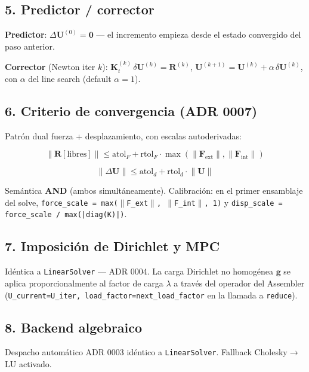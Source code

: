 \documentclass[11pt,letterpaper,oneside]{report}
\begin{document}
\subsection{5. Predictor / corrector}

\textbf{Predictor}: $\Delta\mathbf U^{(0)} = \mathbf 0$ --- el incremento empieza desde el estado convergido del paso anterior.

\textbf{Corrector} (Newton iter $k$): $\mathbf K_t^{(k)}\,\delta\mathbf U^{(k)} = \mathbf R^{(k)}$, $\mathbf U^{(k+1)} = \mathbf U^{(k)} + \alpha\,\delta\mathbf U^{(k)}$, con $\alpha$ del line search (default $\alpha = 1$).

\subsection{6. Criterio de convergencia (ADR 0007)}

Patrón dual fuerza + desplazamiento, con escalas autoderivadas:

\[
\lVert\mathbf R[\text{libres}]\rVert \le \text{atol}_F + \text{rtol}_F \cdot \max(\lVert\mathbf F_{\text{ext}}\rVert, \lVert\mathbf F_{\text{int}}\rVert)
\]

\[
\lVert\Delta\mathbf U\rVert \le \text{atol}_d + \text{rtol}_d \cdot \lVert\mathbf U\rVert
\]

Semántica \textbf{AND} (ambos simultáneamente). Calibración: en el primer ensamblaje del solve, \texttt{force\_scale = max(\ensuremath{\|}F\_ext\ensuremath{\|}, \ensuremath{\|}F\_int\ensuremath{\|}, 1)} y \texttt{disp\_scale = force\_scale / max(|diag(K)|)}.

\subsection{7. Imposición de Dirichlet y MPC}

Idéntica a \texttt{LinearSolver} --- ADR 0004. La carga Dirichlet no homogénea $\mathbf g$ se aplica proporcionalmente al factor de carga $\lambda$ a través del operador del Assembler (\texttt{U\_current=U\_iter, load\_factor=next\_load\_factor} en la llamada a \texttt{reduce}).

\subsection{8. Backend algebraico}

Despacho automático ADR 0003 idéntico a \texttt{LinearSolver}. Fallback Cholesky\ensuremath{\to}LU activado.
\end{document}
